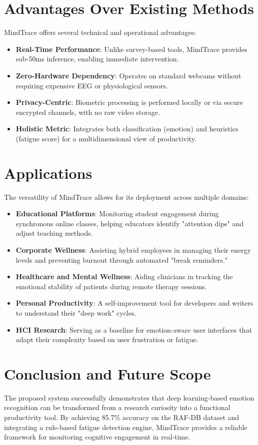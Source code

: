\documentclass[conference]{IEEEtran}
\begin{document}
\section{Advantages Over Existing Methods}
MindTrace offers several technical and operational advantages:
\begin{itemize}[leftmargin=*]
    \item \textbf{Real-Time Performance}: Unlike survey-based tools, MindTrace provides sub-50ms inference, enabling immediate intervention.
    \item \textbf{Zero-Hardware Dependency}: Operates on standard webcams without requiring expensive EEG or physiological sensors.
    \item \textbf{Privacy-Centric}: Biometric processing is performed locally or via secure encrypted channels, with no raw video storage.
    \item \textbf{Holistic Metric}: Integrates both classification (emotion) and heuristics (fatigue score) for a multidimensional view of productivity.
\end{itemize}

\section{Applications}
The versatility of MindTrace allows for its deployment across multiple domains:
\begin{itemize}[leftmargin=*]
    \item \textbf{Educational Platforms}: Monitoring student engagement during synchronous online classes, helping educators identify "attention dips" and adjust teaching methods.
    \item \textbf{Corporate Wellness}: Assisting hybrid employees in managing their energy levels and preventing burnout through automated "break reminders."
    \item \textbf{Healthcare and Mental Wellness}: Aiding clinicians in tracking the emotional stability of patients during remote therapy sessions.
    \item \textbf{Personal Productivity}: A self-improvement tool for developers and writers to understand their "deep work" cycles.
    \item \textbf{HCI Research}: Serving as a baseline for emotion-aware user interfaces that adapt their complexity based on user frustration or fatigue.
\end{itemize}

\section{Conclusion and Future Scope}
The proposed system successfully demonstrates that deep learning-based emotion recognition can be transformed from a research curiosity into a functional productivity tool. By achieving 85.7\% accuracy on the RAF-DB dataset and integrating a rule-based fatigue detection engine, MindTrace provides a reliable framework for monitoring cognitive engagement in real-time.
\end{document}

